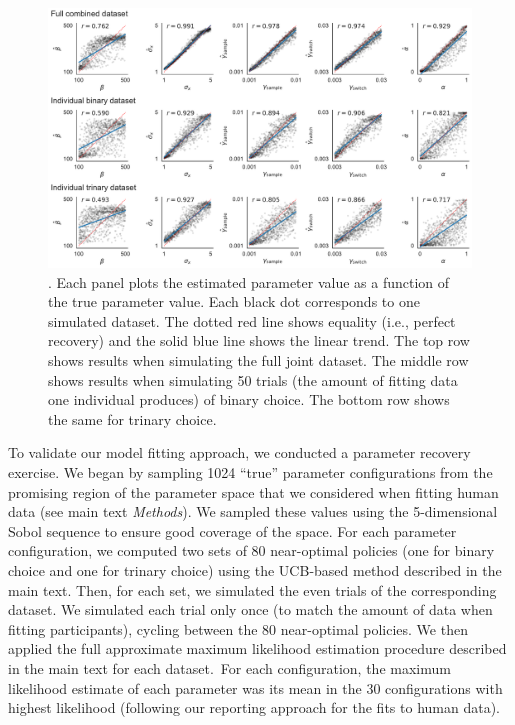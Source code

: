 \begin{figure}[tb!]
  
  \centering
  \includegraphics[width=\textwidth]{figs/attention/supp-recovery.pdf}
  \caption{.
    Each panel plots the estimated parameter value as a function of the true parameter value. Each black dot corresponds to one simulated dataset. The dotted red line shows equality (i.e., perfect recovery) and the solid blue line shows the linear trend. The top row shows results when simulating the full joint dataset. The middle row shows results when simulating 50 trials (the amount of fitting data one individual produces) of binary choice. The bottom row shows the same for trinary choice.
  }
  \label{fig:attention-recovery}
  
\end{figure}

To validate our model fitting approach, we conducted a parameter recovery exercise. We began by sampling 1024 ``true'' parameter configurations from the promising region of the parameter space that we considered when fitting human data (see main text \emph{Methods}). We sampled these values using the 5-dimensional Sobol sequence \citep{sobol1967distribution} to ensure good coverage of the space. For each parameter configuration, we computed two sets of 80 near-optimal policies (one for binary choice and one for trinary choice) using the UCB-based method described in the main text. Then, for each set, we simulated the even trials of the corresponding dataset. We simulated each trial only once (to match the amount of data when fitting participants), cycling between the 80 near-optimal policies. We then applied the full approximate maximum likelihood estimation procedure described in the main text for each dataset.\footnotemark\ For each configuration, the maximum likelihood estimate of each parameter was its mean in the 30 configurations with highest likelihood (following our reporting approach for the fits to human data).

